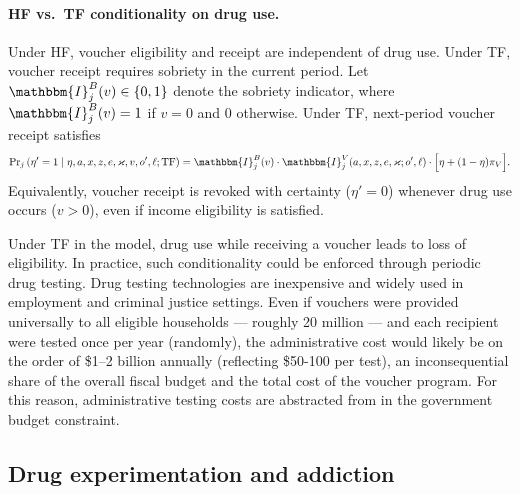 \documentclass[parskip=full]{article}
\theoremstyle{plain}
\theoremstyle{definition}
\theoremstyle{remark}
\begin{document}
\paragraph{HF vs.\ TF conditionality on drug use.}
Under HF, voucher eligibility and receipt are independent of drug use. Under TF, voucher receipt requires sobriety in the current period. Let $\mathbbm{I}_j^{B}(v)\in\{0,1\}$ denote the sobriety indicator, where $\mathbbm{I}_j^{B}(v)=1$ if $v=0$ and $0$ otherwise. Under TF, next-period voucher receipt satisfies
\begin{equation}\label{eq:tf_rule}
\Pr\!_j\left(\eta'=1 \mid \eta,a,x,z,e,\varkappa,v,o',\ell;\text{TF}\right)=
\mathbbm{I}_j^{B}(v)\cdot \mathbbm{I}_j^{V}(a,x,z,e,\varkappa;o',\ell)\cdot\Big[\eta+(1-\eta)\pi_V\Big].
\end{equation}
Equivalently, voucher receipt is revoked with certainty ($\eta'=0$) whenever drug use occurs ($v>0$), even if income eligibility is satisfied.

Under TF in the model, drug use while receiving a voucher leads to loss of eligibility. In practice, such conditionality could be enforced through periodic drug testing. Drug testing technologies are inexpensive and widely used in employment and criminal justice settings. Even if vouchers were provided universally to all eligible households — roughly 20 million — and each recipient were tested once per year (randomly), the administrative cost would likely be on the order of \$1–2 billion annually (reflecting \$50-100 per test), an inconsequential share of the overall fiscal budget and the total cost of the voucher program. For this reason, administrative testing costs are abstracted from in the government budget constraint.

\subsection{Drug experimentation and addiction}\label{sec:addiction}
\end{document}
